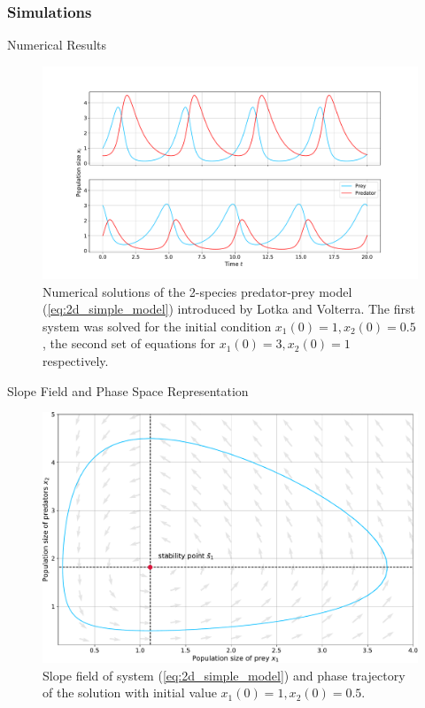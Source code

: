 \documentclass[10pt, dvipsnames]{beamer}
\begin{document}
\subsubsection{Simulations}
\begin{frame}{Numerical Results}

\begin{figure}
    \centering
    \includegraphics[width = \linewidth]{Grafiken/solution_2d_simple_model.pdf}
    \caption{Numerical solutions of the 2-species predator-prey model (\ref{eq:2d_simple_model}) introduced by Lotka and Volterra. The first system was solved for the initial condition $x_1(0)= 1, x_2(0)=0.5$, the second set of equations for $x_1(0)= 3, x_2(0)=1$ respectively.}
    \label{fig:numerical_solutions_2d_simple_model}
\end{figure}
    
\end{frame}
\begin{frame}{Slope Field and Phase Space Representation}

    \begin{figure}
        \centering
        \includegraphics[width = \linewidth]{Grafiken/phase_plot_2d_simple_model.pdf}
        \caption{Slope field of system (\ref{eq:2d_simple_model}) and phase trajectory of the solution with initial value $x_1(0)= 1, x_2(0)=0.5$.}
        \label{fig:phase_plot_2d_simple_model}
    \end{figure}
    
\end{frame}
\end{document}
